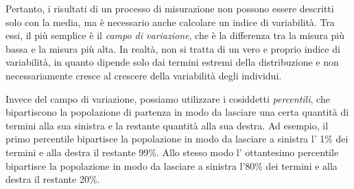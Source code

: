 \documentclass[a4paper,12pt,oneside]{book}
\begin{document}
Pertanto, i risultati di un processo di misurazione non possono essere
descritti solo con la media, ma è necessario anche calcolare un indice
di variabilità. Tra essi, il più semplice è il \emph{campo di
variazione}, che è la differenza tra la misura più bassa e la misura più
alta. In realtà, non si tratta di un vero e proprio indice di
variabilità, in quanto dipende solo dai termini estremi della
distribuzione e non necessariamente cresce al crescere della variabilità
degli individui.

Invece del campo di variazione, possiamo utilizzare i cosiddetti
\emph{percentili}, che bipartiscono la popolazione di partenza in modo
da lasciare una certa quantità di termini alla sua sinistra e la
restante quantità alla sua destra. Ad esempio, il primo percentile
bipartisce la popolazione in modo da lasciare a sinistra l' 1\% dei
termini e alla destra il restante 99\%. Allo stesso modo l' ottantesimo
percentile bipartisce la popolazione in modo da lasciare a sinistra
l'80\% dei termini e alla destra il restante 20\%.
\end{document}
